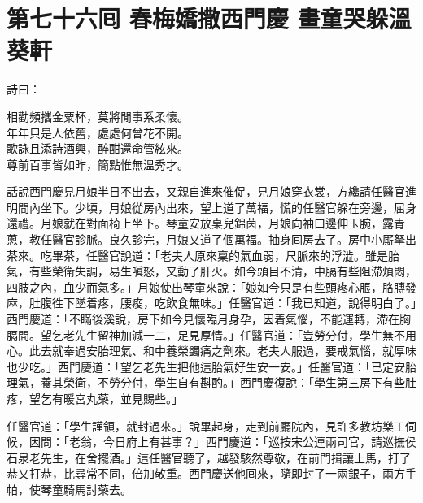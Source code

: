 
\chapter*{第七十六囘 春梅嬌撒西門慶 畫童哭躲溫葵軒}


詩曰：

\begin{myquote} 
相勸頻攜金粟杯，莫將閒事系柔懷。\\年年只是人依舊，處處何曾花不開。\\歌詠且添詩酒興，醉酣還命管絃來。\\尊前百事皆如昨，簡點惟無溫秀才。
\end{myquote} 

話說西門慶見月娘半日不出去，又親自進來催促，見月娘穿衣裳，方纔請任醫官進明間內坐下。{}少頃，月娘從房內出來，望上道了萬福，慌的任醫官躲在旁邊，屈身還禮。月娘就在對面椅上坐下。琴童安放桌兒錦茵，月娘向袖口邊伸玉腕，露青蔥，教任醫官診脈。良久診完，月娘又道了個萬福。抽身囘房去了。房中小厮拏出茶來。吃畢茶，任醫官說道：「老夫人原來稟的氣血弱，尺脈來的浮澁。雖是胎氣，有些榮衛失調，易生嗔怒，又動了肝火。如今頭目不清，中膈有些阻滯煩悶，四肢之內，血少而氣多。」{}月娘使出琴童來說：「娘如今只是有些頭疼心脹，胳膊發麻，肚腹徃下墜着疼，腰痠，吃飲食無味。」任醫官道：「我已知道，說得明白了。」西門慶道：「不瞞後溪說，房下如今見懷臨月身孕，因着氣惱，不能運轉，滯在胸膈間。望乞老先生留神加減一二，足見厚情。」{}任醫官道：「豈勞分付，學生無不用心。此去就奉過安胎理氣、和中養榮蠲痛之劑來。老夫人服過，要戒氣惱，{}就厚味也少吃。」西門慶道：「望乞老先生把他這胎氣好生安一安。」任醫官道：「已定安胎理氣，養其榮衛，不勞分付，學生自有斟酌。」西門慶復說：「學生第三房下有些肚疼，望乞有暖宮丸藥，並見賜些。」

任醫官道：「學生謹領，就封過來。」說畢起身，走到前廳院內，見許多教坊樂工伺候，因問：「老翁，今日府上有甚事？」西門慶道：「巡按宋公連兩司官，請巡撫侯石泉老先生，在舍擺酒。」這任醫官聽了，越發駭然尊敬，在前門揖讓上馬，打了恭又打恭，比尋常不同，倍加敬重。西門慶送他囘來，隨即封了一兩銀子，兩方手帕，使琴童騎馬討藥去。

